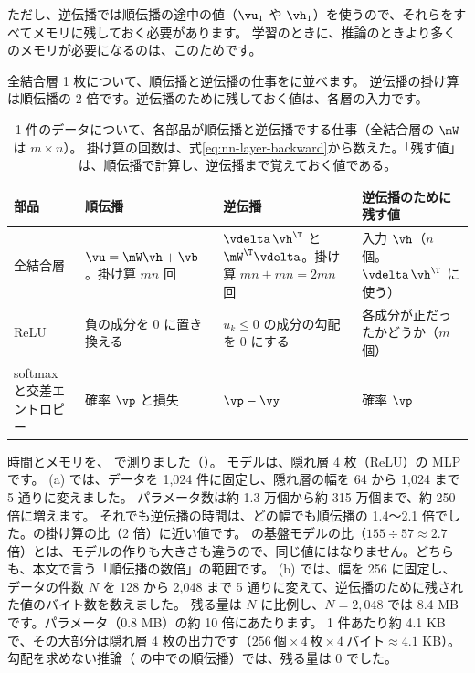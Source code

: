 ただし、逆伝播では順伝播の途中の値（$\vu_1$ や $\vh_1$）を使うので、それらをすべてメモリに残しておく必要があります。
学習のときに、推論のときより多くのメモリが必要になるのは、このためです。

全結合層 1 枚について、順伝播と逆伝播の仕事をに並べます。
逆伝播の掛け算は順伝播の 2 倍です。逆伝播のために残しておく値は、各層の入力です。

\begin{table}[tbp]
\centering
\caption{1 件のデータについて、各部品が順伝播と逆伝播でする仕事（全結合層の $\mW$ は $m\times n$）。
掛け算の回数は、式\eqref{eq:nn-layer-backward}から数えた。「残す値」は、順伝播で計算し、逆伝播まで覚えておく値である。}
\label{tab:nn-fb-work}
\small
\setlength{\tabcolsep}{4pt}
\begin{tabular}{@{}>{\raggedright\arraybackslash}p{24mm}>{\raggedright\arraybackslash}p{28mm}>{\raggedright\arraybackslash}p{38mm}>{\raggedright\arraybackslash}p{30mm}@{}}
\toprule
部品 & 順伝播 & 逆伝播 & 逆伝播のために残す値 \\
\midrule
全結合層 & $\vu=\mW\vh+\vb$。掛け算 $mn$ 回 & $\vdelta\,\vh^\T$ と $\mW^\T\vdelta$。掛け算 $mn+mn=2mn$ 回 & 入力 $\vh$（$n$ 個。$\vdelta\,\vh^\T$ に使う） \\ \addlinespace
ReLU & 負の成分を 0 に置き換える & $u_k\le 0$ の成分の勾配を 0 にする & 各成分が正だったかどうか（$m$ 個） \\ \addlinespace
softmax と交差エントロピー & 確率 $\vp$ と損失 & $\vp-\vy$ & 確率 $\vp$ \\
\bottomrule
\end{tabular}
\end{table}

時間とメモリを、 で測りました（）。
モデルは、隠れ層 4 枚（ReLU）の MLP です。
(a) では、データを 1,024 件に固定し、隠れ層の幅を 64 から 1,024 まで 5 通りに変えました。
パラメータ数は約 1.3 万個から約 315 万個まで、約 250 倍に増えます。
それでも逆伝播の時間は、どの幅でも順伝播の 1.4〜2.1 倍でした。の掛け算の比（2 倍）に近い値です。
の基盤モデルの比（$155\div57\approx2.7$ 倍）とは、モデルの作りも大きさも違うので、同じ値にはなりません。どちらも、本文で言う「順伝播の数倍」の範囲です。
(b) では、幅を 256 に固定し、データの件数 $N$ を 128 から 2,048 まで 5 通りに変えて、逆伝播のために残された値のバイト数を数えました。
残る量は $N$ に比例し、$N=2{,}048$ では 8.4 MB です。パラメータ（0.8 MB）の約 10 倍にあたります。
1 件あたり約 4.1 KB で、その大部分は隠れ層 4 枚の出力です（$256\ \text{個}\times 4\ \text{枚}\times 4\ \text{バイト}\approx 4.1$ KB）。
勾配を求めない推論（ の中での順伝播）では、残る量は 0 でした。

